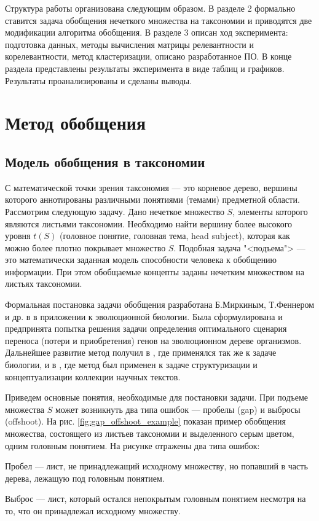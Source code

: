 \documentclass[12pt]{article}
\newenvironment{itemize*}%
{\begin{itemize}%
	\setlength{\itemsep}{0pt}%
	\setlength{\parskip}{0pt}}%
{\end{itemize}}
\let\oldsection\section
\let\oldsubsection\subsection
\renewcommand{\section}{\clearpage\oldsection}
\renewcommand{\subsection}{\clearpage\oldsubsection}
\begin{document}
Структура работы организована следующим образом. В разделе 2 формально ставится задача обобщения нечеткого множества на таксономии и приводятся две модификации алгоритма обобщения.  В разделе 3 описан ход эксперимента: подготовка данных, методы вычисления матрицы релевантности и корелевантности, метод кластеризации, описано разработанное ПО. В конце раздела представлены результаты эксперимента в виде таблиц и графиков. Результаты проанализированы и сделаны выводы.


\section{Метод обобщения}

\oldsubsection{Модель обобщения в таксономии}

С математической точки зрения таксономия --- это корневое дерево, вершины которого аннотированы различными понятиями (темами) предметной области. Рассмотрим следующую задачу. Дано нечеткое множество $S$, элементы которого являются листьями таксономии. Необходимо найти вершину более высокого уровня $t(S)$ (головное понятие, головная тема, head subject), которая как можно более плотно покрывает множество $S$. Подобная задача "<подъема"> --- это математически заданная модель способности человека к обобщению информации. При этом обобщаемые концепты заданы нечетким множеством на листьях таксономии.

Формальная постановка задачи обобщения разработана Б.Миркиным, Т.Феннером и др. в \cite{mirkin2003algorithms} в приложении к эволюционной биологии. Была сформулирована и предпринята попытка решения задачи определения оптимального сценария переноса (потери и приобретения) генов на эволюционном дереве организмов. Дальнейшее развитие метод получил в \cite{mirkin2006aggregating}, где применялся так же к задаче биологии, и в \cite{mirkin2018preprint}, где метод был применен к задаче структуризации и концептуализации коллекции научных текстов.

Приведем основные понятия, необходимые для постановки задачи. При подъеме множества $S$ может возникнуть два типа ошибок --- пробелы (gap) и выбросы (offshoot). На рис. \ref{fig:gap_offshoot_example} показан пример обобщения множества, состоящего из листьев таксономии и выделенного серым цветом, одним головным понятием. На рисунке отражены два типа ошибок:
\begin{itemize*}
	\item Пробел ---  лист, не принадлежащий исходному множеству, но попавший в часть дерева, лежащую под головным понятием.
	\item Выброс --- лист, который остался непокрытым головным понятием несмотря на то, что он принадлежал исходному множеству. 
\end{itemize*} 
\end{document}
